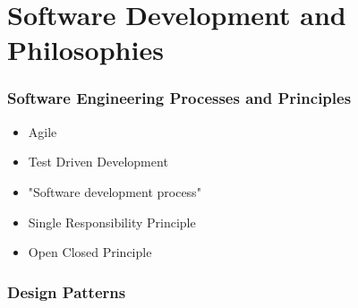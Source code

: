 

\part*{Software Development and Philosophies}



\toclineskip
\section{Software Engineering Processes and Principles}


\begin{itemize}
	\item Agile
	\item Test Driven Development
	\item "Software development process"
	\item Single Responsibility Principle
	\item Open Closed Principle
\end{itemize}


\toclineskip
\section{Design Patterns}

